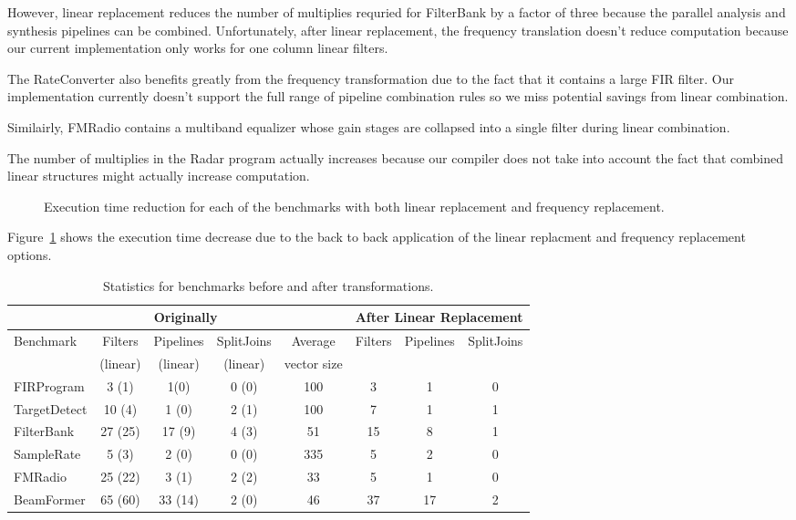 However, linear replacement reduces the number of multiplies 
requried for FilterBank by a factor of three because the parallel analysis and 
synthesis pipelines can be combined. Unfortunately, after
linear replacement, the frequency translation doesn't reduce computation 
because our current implementation only works for one column linear filters.

The RateConverter also benefits greatly from the frequency
transformation due to the fact that it contains a large FIR
filter. Our implementation currently doesn't support the full range of
pipeline combination rules so we miss potential savings from linear
combination.

Similairly, FMRadio contains a multiband equalizer whose gain stages are collapsed
into a single filter during linear combination.

The number of multiplies in the Radar program actually increases because our 
compiler does not take into account the fact that combined linear structures 
might actually increase computation. %

\begin{figure}
\center
\epsfxsize=3.2in
\vspace{-6pt}
\caption{Execution time reduction for each of the benchmarks with both linear replacement and frequency replacement.}
\label{fig:execution-speedup}
\vspace{-12pt}
\end{figure}

Figure~\ref{fig:execution-speedup} shows the execution time decrease due to the back to back
application of the linear replacment and frequency replacement options.


\begin{table*}[t]
\centering
\small
\begin{tabular}{|l|c|c|c||c||c|c|c|} 
\hline
          & \multicolumn{3}{|c||}{Originally}  &             & \multicolumn{3}{|c|}{After Linear Replacement} \\
\hline
Benchmark & Filters & Pipelines & SplitJoins & Average     & Filters      & Pipelines         & SplitJoins \\
          & (linear)& (linear)  & (linear)   & vector size &              &                   &            \\
\hline
FIRProgram & 3 (1) & 1(0) & 0 (0) & 100 & 3 & 1 & 0 \\
\hline
TargetDetect & 10 (4) & 1 (0) & 2 (1) & 100 & 7 & 1 & 1 \\
\hline
FilterBank & 27 (25) & 17 (9) & 4 (3) & 51 & 15 & 8 & 1 \\
\hline
SampleRate & 5 (3) & 2 (0) & 0 (0) & 335 & 5 & 2 & 0 \\
\hline
FMRadio & 25 (22) & 3 (1) & 2 (2) & 33 & 5 & 1 & 0 \\
\hline
BeamFormer & 65 (60) & 33 (14) & 2 (0) & 46 & 37 & 17 & 2\\
\hline
\end{tabular}
\caption{Statistics for benchmarks before and after transformations.}
\label{fig:benchmark-stastics}
\end{table*}
